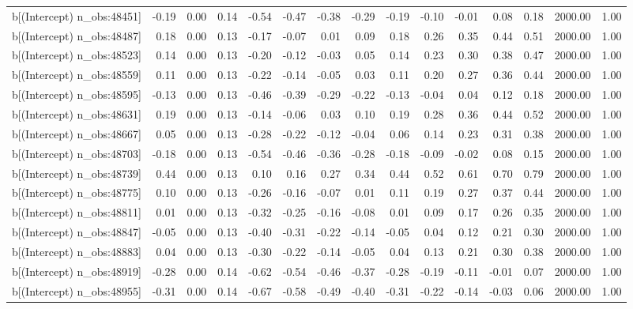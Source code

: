 \begin{table}[ht]
\begin{tabular}{rrrrrrrrrrrrrrr}
  b[(Intercept) n\_obs:48451] & -0.19 & 0.00 & 0.14 & -0.54 & -0.47 & -0.38 & -0.29 & -0.19 & -0.10 & -0.01 & 0.08 & 0.18 & 2000.00 & 1.00 \\ 
  b[(Intercept) n\_obs:48487] & 0.18 & 0.00 & 0.13 & -0.17 & -0.07 & 0.01 & 0.09 & 0.18 & 0.26 & 0.35 & 0.44 & 0.51 & 2000.00 & 1.00 \\ 
  b[(Intercept) n\_obs:48523] & 0.14 & 0.00 & 0.13 & -0.20 & -0.12 & -0.03 & 0.05 & 0.14 & 0.23 & 0.30 & 0.38 & 0.47 & 2000.00 & 1.00 \\ 
  b[(Intercept) n\_obs:48559] & 0.11 & 0.00 & 0.13 & -0.22 & -0.14 & -0.05 & 0.03 & 0.11 & 0.20 & 0.27 & 0.36 & 0.44 & 2000.00 & 1.00 \\ 
  b[(Intercept) n\_obs:48595] & -0.13 & 0.00 & 0.13 & -0.46 & -0.39 & -0.29 & -0.22 & -0.13 & -0.04 & 0.04 & 0.12 & 0.18 & 2000.00 & 1.00 \\ 
  b[(Intercept) n\_obs:48631] & 0.19 & 0.00 & 0.13 & -0.14 & -0.06 & 0.03 & 0.10 & 0.19 & 0.28 & 0.36 & 0.44 & 0.52 & 2000.00 & 1.00 \\ 
  b[(Intercept) n\_obs:48667] & 0.05 & 0.00 & 0.13 & -0.28 & -0.22 & -0.12 & -0.04 & 0.06 & 0.14 & 0.23 & 0.31 & 0.38 & 2000.00 & 1.00 \\ 
  b[(Intercept) n\_obs:48703] & -0.18 & 0.00 & 0.13 & -0.54 & -0.46 & -0.36 & -0.28 & -0.18 & -0.09 & -0.02 & 0.08 & 0.15 & 2000.00 & 1.00 \\ 
  b[(Intercept) n\_obs:48739] & 0.44 & 0.00 & 0.13 & 0.10 & 0.16 & 0.27 & 0.34 & 0.44 & 0.52 & 0.61 & 0.70 & 0.79 & 2000.00 & 1.00 \\ 
  b[(Intercept) n\_obs:48775] & 0.10 & 0.00 & 0.13 & -0.26 & -0.16 & -0.07 & 0.01 & 0.11 & 0.19 & 0.27 & 0.37 & 0.44 & 2000.00 & 1.00 \\ 
  b[(Intercept) n\_obs:48811] & 0.01 & 0.00 & 0.13 & -0.32 & -0.25 & -0.16 & -0.08 & 0.01 & 0.09 & 0.17 & 0.26 & 0.35 & 2000.00 & 1.00 \\ 
  b[(Intercept) n\_obs:48847] & -0.05 & 0.00 & 0.13 & -0.40 & -0.31 & -0.22 & -0.14 & -0.05 & 0.04 & 0.12 & 0.21 & 0.30 & 2000.00 & 1.00 \\ 
  b[(Intercept) n\_obs:48883] & 0.04 & 0.00 & 0.13 & -0.30 & -0.22 & -0.14 & -0.05 & 0.04 & 0.13 & 0.21 & 0.30 & 0.38 & 2000.00 & 1.00 \\ 
  b[(Intercept) n\_obs:48919] & -0.28 & 0.00 & 0.14 & -0.62 & -0.54 & -0.46 & -0.37 & -0.28 & -0.19 & -0.11 & -0.01 & 0.07 & 2000.00 & 1.00 \\ 
  b[(Intercept) n\_obs:48955] & -0.31 & 0.00 & 0.14 & -0.67 & -0.58 & -0.49 & -0.40 & -0.31 & -0.22 & -0.14 & -0.03 & 0.06 & 2000.00 & 1.00 \\ 

\end{tabular}
\end{table}
